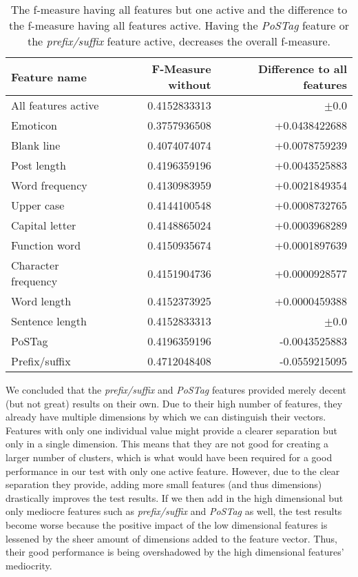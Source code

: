 \begin{table}[ht!]
	\begin{center}
    \begin{tabular}{l|r|r}
	Feature name		& F-Measure without & Difference to all features \\ \hline \hline
	All features active	& 0.4152833313 & $\pm$0.0 \\ \hline \hline
	Emoticon			& 0.3757936508 & +0.0438422688 \\ \hline
	Blank line			& 0.4074074074 & +0.0078759239 \\ \hline
	Post length			& 0.4196359196 & +0.0043525883 \\ \hline
	Word frequency		& 0.4130983959 & +0.0021849354 \\ \hline
	Upper case			& 0.4144100548 & +0.0008732765 \\ \hline
	Capital letter		& 0.4148865024 & +0.0003968289 \\ \hline
	Function word		& 0.4150935674 & +0.0001897639 \\ \hline
	Character frequency	& 0.4151904736 & +0.0000928577 \\ \hline
	Word length			& 0.4152373925 & +0.0000459388 \\ \hline
	Sentence length		& 0.4152833313 & $\pm$0.0 	   \\ \hline
	PoSTag				& 0.4196359196 & -0.0043525883 \\ \hline
	Prefix/suffix		& 0.4712048408 & -0.0559215095 \\
    \end{tabular}
    \end{center}
	\caption{The f-measure having all features but one active and the difference to the f-measure having all features active. Having the \textit{PoSTag} feature or the \textit{prefix/suffix} feature active, decreases the overall f-measure.}
	\label{tab:feature_evaluation_1}
\end{table}

We concluded that the \textit{prefix/suffix} and \textit{PoSTag} features provided merely decent (but not great) results on their own.
Due to their high number of features, they already have multiple dimensions by which we can distinguish their vectors.
Features with only one individual value might provide a clearer separation but only in a single dimension.
This means that they are not good for creating a larger number of clusters, which is what would have been required for a good performance in our test with only one active feature.
However, due to the clear separation they provide, adding more small features (and thus dimensions) drastically improves the test results.
If we then add in the high dimensional but only mediocre features such as \textit{prefix/suffix} and \textit{PoSTag} as well, the test results become worse because the positive impact of the low dimensional features is lessened by the sheer amount of dimensions added to the feature vector.
Thus, their good performance is being overshadowed by the high dimensional features' mediocrity.


